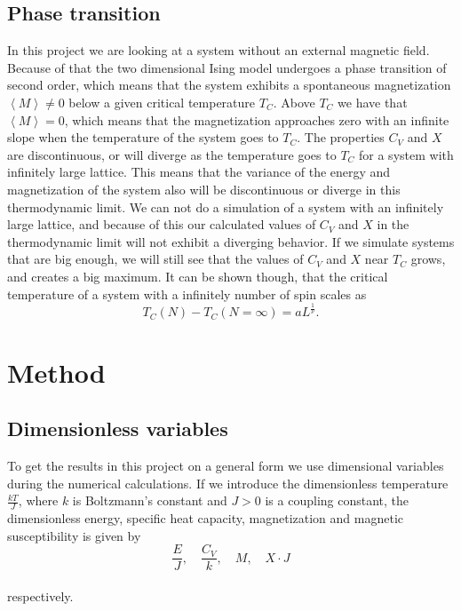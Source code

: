 \documentclass[12pt]{article}
\begin{document}
\begin{flushleft}
\subsection{Phase transition}
In this project we are looking at a system without an external magnetic field. Because of that the two dimensional Ising model undergoes a phase transition of second order, which means that the system exhibits a spontaneous magnetization $\left<M\right> \neq 0$ below a given critical temperature $T_C$. Above $T_C$ we have that $\left<M\right> = 0$, which means that the magnetization approaches zero with an infinite slope when the temperature of the system goes to $T_C$. The properties $C_V$ and $X$ are discontinuous, or will diverge as the temperature goes to $T_C$ for a system with infinitely large lattice. This means that the variance of the energy and magnetization of the system also will be discontinuous or diverge in this thermodynamic limit. We can not do a simulation of a system with an infinitely large lattice, and because of this our calculated values of $C_V$ and $X$ in the thermodynamic limit will not exhibit a diverging behavior. If we simulate systems that are big enough, we will still see that the values of $C_V$ and $X$ near $T_C$ grows, and creates a big maximum. It can be shown though, that the critical temperature of a system with a infinitely number of spin scales as
\vspace{5mm}
\begin{equation}\label{eq:propto_TC}
T_C(N) -T_C(N = \infty) = aL^{\frac{1}{\nu}}.
\end{equation}
\vspace{5mm}

\section{Method}
\subsection{Dimensionless variables}
To get the results in this project on a general form we use dimensional variables during the numerical calculations. If we introduce the dimensionless temperature $\frac{kT}{J}$, where $k$ is Boltzmann's constant and $J>0$ is a coupling constant, the dimensionless energy, specific heat capacity, magnetization and magnetic susceptibility is given by
\vspace{5mm}
$$\frac{E}{J},\quad \frac{C_V}{k},\quad M,\quad X\cdot J$$\\
\vspace{5mm}
respectively.

\end{flushleft}
\end{document}
